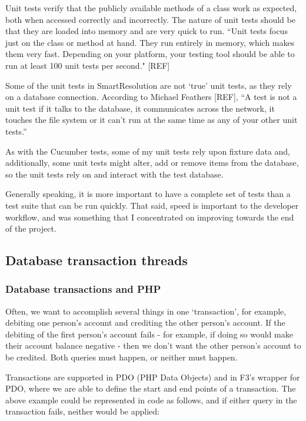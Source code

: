 Unit tests verify that the publicly available methods of a class work as expected, both when accessed correctly and incorrectly. The nature of unit tests should be that they are loaded into memory and are very quick to run. ``Unit tests focus just on the class or method at hand. They run entirely in memory, which makes them very fast. Depending on your platform, your testing tool should be able to run at least 100 unit tests per second." [REF] %

Some of the unit tests in SmartResolution are not `true' unit tests, as they rely on a database connection. According to Michael Feathers [REF], ``A test is not a unit test if it talks to the database, it communicates across the network, it touches the file system or it can't run at the same time as any of your other unit tests.'' %

As with the Cucumber tests, some of my unit tests rely upon fixture data and, additionally, some unit tests might alter, add or remove items from the database, so the unit tests rely on and interact with the test database.

Generally speaking, it is more important to have a complete set of tests than a test suite that can be run quickly. That said, speed is important to the developer workflow, and was something that I concentrated on improving towards the end of the project.

\subsection{Database transaction threads}

\subsubsection{Database transactions and PHP}

Often, we want to accomplish several things in one `transaction', for example, debiting one person's account and crediting the other person's account. If the debiting of the first person's account fails - for example, if doing so would make their account balance negative - then we don't want the other person's account to be credited. Both queries must happen, or neither must happen.

Transactions are supported in PDO (PHP Data Objects) and in F3's wrapper for PDO, where we are able to define the start and end points of a transaction. The above example could be represented in code as follows, and if either query in the transaction fails, neither would be applied:

